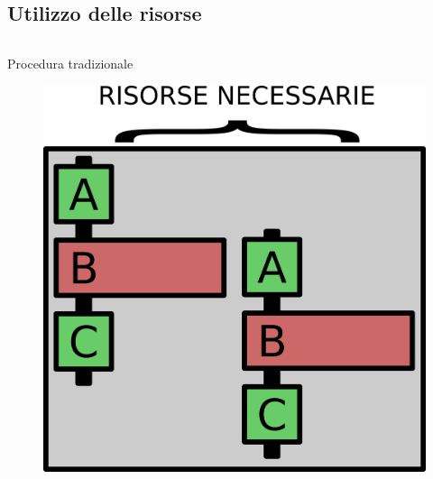 \documentclass{beamer}
\begin{document}
\subsection{Utilizzo delle risorse}
\begin{frame}
\begin{columns}
\begin{column}{0.8\linewidth}
\begin{block}{Procedura tradizionale}
\begin{figure}[H]
\centering
\includegraphics[scale=0.3]{concurrency1.png}
\end{figure}
\end{block}
\end{column}
\end{columns}
\end{frame}
\end{document}

